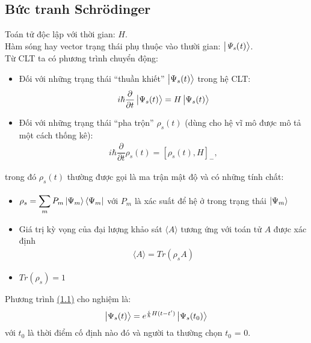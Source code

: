 \documentclass{report}
\begin{document}
\subsection{Bức tranh Schr\"{o}dinger}
Toán tử độc lập với thời gian: $H$.\\
Hàm sóng hay vector trạng thái phụ thuộc vào thười gian: $\mathit{\ket{\Psi_{s}(t)}}$.\\
Từ CLT ta có phương trình chuyển động:
\begin{itemize}
	\item Đối với những trạng thái ``thuần khiết'' $\ket{\Psi_{s}(t)}$ trong hệ CLT:
	      \begin{align}\label{eq1.1}
		      i \hbar \dfrac{\partial}{\partial{t}}\ket{\Psi_{s}(t)} = H \ket{\Psi_{s}(t)}
	      \end{align}
	\item Đối với những trạng thái ``pha trộn'' $\mathit{\rho_{s}(t)}$ (dùng cho hệ vĩ mô được mô tả một cách thống kê):
	      \begin{align}
		      i \hbar \dfrac{\partial}{\partial{t}}\rho_{s}(t) = \left[ \rho_{s}(t),H \right]_{-} ,
	      \end{align}
\end{itemize}
trong đó $\rho_{s}(t)$ thường được gọi là ma trận mật độ và có những tính chất:
\begin{itemize}
	\item	$\begin{aligned}[t]
			      \rho_{s} = \sum_{m}^{}P_{m} \ket{\Psi_{m}} \bra{\Psi_{m}}
		      \end{aligned}$	với $P_{m}$ là xác suất để hệ ở trong trạng thái $\ket{\Psi_{m}}$
	\item  	Giá trị kỳ vọng của đại lượng khảo sát $\langle A \rangle$ tương ứng với toán tử $A$ được xác định
	      \begin{align*}
		      \langle A \rangle = Tr(\rho_{s}A)
	      \end{align*}
	\item $Tr(\rho_s) = 1$
\end{itemize}
Phương trình \hyperref[eq1.1]{(1.1)} cho nghiệm là:
\begin{align}
	\ket{\Psi_{s}(t)} = e^{\frac{i}{\hbar}H(t-t')} \ket{\Psi_{s}(t_{0})}
\end{align}
với $t_0$ là thời điểm cố định nào đó và người ta thường chọn $t_0$ = 0.
\end{document}
